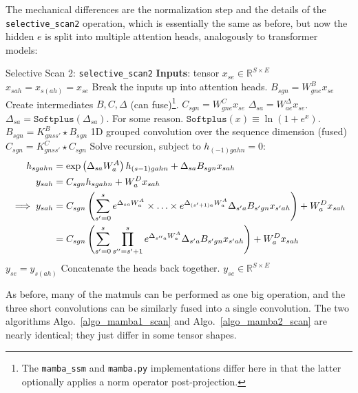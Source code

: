 \documentclass[11pt]{article}
\begin{document}
The mechanical differences are the normalization step and the details of the
\texttt{selective\_scan2} operation, which is essentially the same as before, but now the hidden $ e
$ is split into multiple attention heads, analogously to transformer models:

\begin{algo}{Selective Scan 2: \texttt{selective\_scan2} }
\State \textbf{Inputs}: tensor $ x _{ se }\in \mathbb{R}^{ S\times E } $
\State $ x _{ sah } = x _{ s(ah) } = x_{ se } $  \Comment Break the inputs up into attention heads.
\State $ B _{ sgn } = W ^{ B }_{ gne }x _{ se } $  \Comment Create intermediates $B, C, \Delta  $ (can
fuse)\footnote{The \texttt{mamba\_ssm} and \texttt{mamba.py} implementations differ here in that the
latter optionally applies a norm operator post-projection.}.
\State $ C _{ sgn } = W ^{ C }_{ gne }x _{ se } $
\State $ \Delta  _{ sa } = W ^{ \Delta   }_{ ae } x _{ se } $.
\State $ \Delta  _{ sa } = \texttt{Softplus} \left (\Delta _{ sa }\right ) $. \Comment For some reason. $ \texttt{Softplus}(x) \equiv \ln \left ( 1+ e^{ x } \right ) $.
\State $ B _{ sgn } = K ^{ B } _{ gnss' }\star B_{ sgn}$ \Comment 1D grouped convolution over the sequence dimension (fused)
\State $ C _{ sgn } = K ^{ C } _{ gnss' }\star C_{ sgn }$
\State Solve recursion, subject to $ h _{ (-1)gahn }=0 $:
\begin{align}
    h _{ sgahn } &= \exp \left ( \Delta  _{ sa } W^{A} _{ a } \right ) h _{ (s-1)gah n} + \Delta _{ sa }B _{ sgn }x _{ sah }\nonumber\\
    y _{ sah } &= C _{ sgn }h _{ sgahn } +  W ^{ D } _{ a }x _{ sah } \nonumber\\
    \implies y _{ sah } &= C _{ sgn }\left (\sum _{ s'=0 }^{ s }e^{ \Delta _{ sa }W^{A} _{ a } }\times \ldots \times e^{ \Delta _{ (s'+1)a }W^{A} _{ a } } \Delta _{ s'a }B _{ s'gn } x _{ s'ah }\right ) + W ^{ D } _{ a } x _{ sah }\nonumber\\
   &= C _{ sgn }\left (\sum _{ s'=0 }^{ s }\prod_{ s''=s'+1 }^{ s  }e^{ \Delta _{ s''a }W^{A} _{ a } } \Delta _{ s'a }B _{ s'gn } x _{ s'ah }\right ) + W ^{ D } _{ a } x _{ sah }
\end{align}
\State $ y _{ se } = y _{ s(ah) } $  \Comment Concatenate the heads back together.
\State \Return $ y _{ se } \in \mathbb{R}^{ S\times E }$
\label{algo_mamba2_scan}
\end{algo}
As before, many of the matmuls can be performed as one big operation, and the three short
convolutions can be similarly fused into a single convolution. The two algorithms
Algo.~\ref{algo_mamba1_scan} and Algo.~\ref{algo_mamba2_scan} are nearly identical; they just differ
in some tensor shapes.
\end{document}
